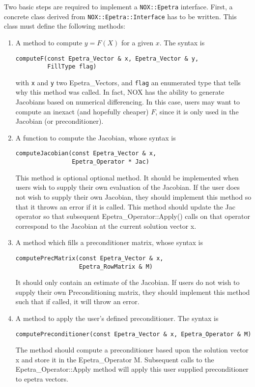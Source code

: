 Two basic steps are required to implement a \verb!NOX::Epetra!
interface. First, a concrete class derived from
\verb!NOX::Epetra::Interface! has to be written. This class must define
the following methods:
\begin{enumerate}
\item A method to compute $y = F(X)$ for a given $x$. The syntax is
\begin{verbatim}
computeF(const Epetra_Vector & x, Epetra_Vector & y, 
         FillType flag)
\end{verbatim}
with \verb!x! and \verb!y! two Epetra\_Vectors, and \verb!flag! an
enumerated type that tells why this method was called. In fact, NOX has
the ability to generate Jacobians based on numerical differencing. In
this case, users may want to compute an inexact (and hopefully cheaper)
$F$, since it is only used in the Jacobian (or preconditioner).
\item A function to compute the Jacobian, whose syntax is
\begin{verbatim}
computeJacobian(const Epetra_Vector & x, 
                Epetra_Operator * Jac)
\end{verbatim}
  This method is optional optional method. It should be implemented when
  users wish to supply their own evaluation of the Jacobian. If the user
  does not wish to supply their own Jacobian, they should implement this
  method so that it throws an error if it is called. This method should
  update the Jac operator so that subsequent Epetra\_Operator::Apply()
  calls on that operator correspond to the Jacobian at the current
  solution vector x.
\item A method which fills a preconditioner matrix, whose syntax is
\begin{verbatim}
computePrecMatrix(const Epetra_Vector & x, 
                  Epetra_RowMatrix & M)
\end{verbatim}
  It should only contain an estimate of the Jacobian. If users do not
  wish to supply their own Preconditioning matrix, they should implement
  this method such that if called, it will throw an error.
\item A method to apply the user's defined preconditioner. The syntax is
\begin{verbatim}
computePreconditioner(const Epetra_Vector & x, Epetra_Operator & M)
\end{verbatim}
  The method should compute a preconditioner based upon the solution
  vector x and store it in the Epetra\_Operator M. Subsequent calls to
  the Epetra\_Operator::Apply method will apply this user supplied
  preconditioner to epetra vectors.
\end{enumerate}


